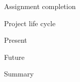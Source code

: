 \sec Assignment completion


\sec Project life cycle


\secc Present


\secc Future


\sec Summary



\bye
